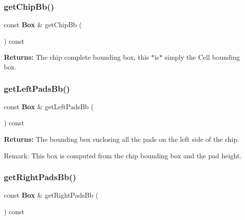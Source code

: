 \subsubsection{\texorpdfstring{get\+Chip\+Bb()}{getChipBb()}}
{\footnotesize\ttfamily const \textbf{ Box} \& get\+Chip\+Bb (\begin{DoxyParamCaption}{ }\end{DoxyParamCaption}) const\hspace{0.3cm}{\ttfamily [inline]}}

{\bfseries Returns\+:} The chip complete bounding box, this $\ast$is$\ast$ simply the Cell bounding box. \mbox{\label{classKatabatic_1_1ChipTools_aa6b5ac93ecf1ee9f94f5176664dcf4bf}} 
\subsubsection{\texorpdfstring{get\+Left\+Pads\+Bb()}{getLeftPadsBb()}}
{\footnotesize\ttfamily const \textbf{ Box} \& get\+Left\+Pads\+Bb (\begin{DoxyParamCaption}{ }\end{DoxyParamCaption}) const\hspace{0.3cm}{\ttfamily [inline]}}

{\bfseries Returns\+:} The bounding box enclosing all the pads on the left side of the chip.

\begin{DoxyParagraph}{Remark\+:}
This box is computed from the chip bounding box and the pad height. 
\end{DoxyParagraph}
\mbox{\label{classKatabatic_1_1ChipTools_a07e88c4c6a615019e618af327829f4d0}} 
\subsubsection{\texorpdfstring{get\+Right\+Pads\+Bb()}{getRightPadsBb()}}
{\footnotesize\ttfamily const \textbf{ Box} \& get\+Right\+Pads\+Bb (\begin{DoxyParamCaption}{ }\end{DoxyParamCaption}) const\hspace{0.3cm}{\ttfamily [inline]}}

